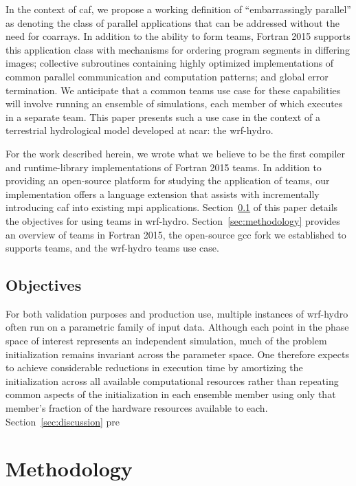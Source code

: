 In the context of \gls{caf}, we propose a working definition of ``embarrassingly parallel'' as denoting the class of parallel
applications that can be addressed without the need for \glspl{coarray}.  In addition to the ability to form teams, Fortran
2015 supports this application class with mechanisms for ordering program segments in differing images; collective subroutines
containing highly optimized implementations of common parallel communication and computation patterns; and global error
termination.  We anticipate that a common teams use case for these capabilities will involve running an ensemble of simulations,
each member of which executes in a separate team.  This paper presents such a use case in the context of a terrestrial
hydrological model developed at \gls{ncar}: the \gls{wrf-hydro}.

For the work described herein, we wrote what we believe to be the first compiler and runtime-library implementations of Fortran
2015 teams.  In addition to providing an open-source platform for studying the application of teams, our implementation offers a
language extension that assists with incrementally introducing \gls{caf} into existing \gls{mpi} applications.
Section~\ref{sec:objectives} of this paper details the objectives for using teams in \gls{wrf-hydro}.
Section~\ref{sec:methodology} provides an overview of teams in Fortran 2015, the open-source \gls{gcc} fork we established to
supports teams, and the \gls{wrf-hydro} teams use case.

\subsection{Objectives}\label{sec:objectives}
For both validation purposes and production use, multiple instances of \gls{wrf-hydro} often run on a parametric family of
input data.  Although each point in the phase space of interest represents an independent simulation, much of the problem
initialization remains invariant across the parameter space.  One therefore expects to achieve considerable reductions in
execution time by amortizing the initialization across all available computational resources rather than repeating common
aspects of the initialization in each ensemble member using only that member's fraction of the hardware resources available to
each. Section~\ref{sec:discussion} pre

\section{Methodology}
